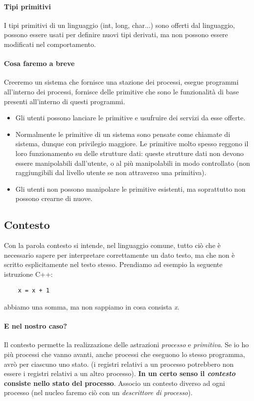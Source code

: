 \documentclass[11pt]{report}
\theoremstyle{definition}
\begin{document}
\paragraph{Tipi primitivi} I tipi primitivi di un linguaggio (int, long, char...) sono offerti dal linguaggio, possono essere usati per definire nuovi tipi derivati, ma non possono essere modificati nel comportamento.

\paragraph{Cosa faremo a breve} Creeremo un sistema che fornisce una stazione dei processi, esegue programmi all'interno dei processi, fornisce delle primitive che sono le funzionalità di base presenti all'interno di questi programmi.
\begin{itemize}
	\item Gli utenti possono lanciare le primitive e usufruire dei servizi da esse offerte.
	\item Normalmente le primitive di un sistema sono pensate come {chiamate di sistema}, dunque con privilegio maggiore. Le primitive molto spesso reggono il loro funzionamento su delle strutture dati: queste strutture dati non devono essere manipolabili dall'utente, o al più manipolabili in modo controllato (non raggiungibili dal livello utente se non attraverso una primitiva).
	\item Gli utenti non possono manipolare le primitive esistenti, ma soprattutto non possono crearne di nuove.
\end{itemize}

\subsection{Contesto}
Con la parola contesto si intende, nel linguaggio comune, tutto ciò che è necessario sapere per interpretare correttamente un dato testo, ma che non è scritto esplicitamente nel testo stesso. Prendiamo ad esempio la seguente istruzione C++:
\begin{verbatim}
	x = x + 1
\end{verbatim}
abbiamo una somma, ma non sappiamo in cosa consista \emph{x}.

\paragraph{E nel nostro caso?} Il contesto permette la realizzazione delle astrazioni \emph{processo} e \emph{primitiva}. Se io ho più processi che vanno avanti, anche processi che eseguono lo stesso programma, avrò per ciascuno uno stato. (i registri relativi a un processo potrebbero non essere i registri relativi a un altro processo). \textbf{In un certo senso il \emph{contesto} consiste nello stato del processo}. Associo un contesto diverso ad ogni processo (nel nucleo faremo ciò con un \emph{descrittore di processo}).
\end{document}
